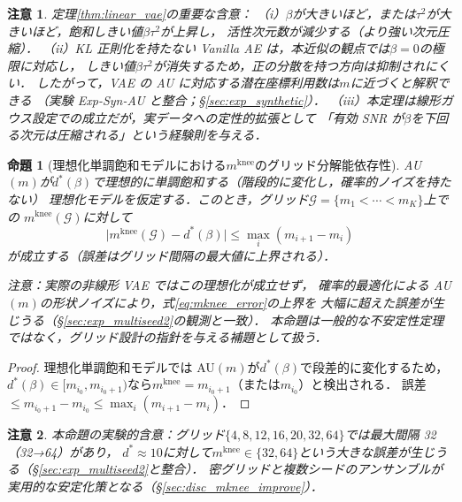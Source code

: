 \documentclass[11pt,a4paper]{jsarticle}
\newtheorem{proposition}{命題}
\newtheorem{remark}{注意}
\newcommand{\mknee}{m^{\mathrm{knee}}}
\begin{document}
\begin{remark}
定理\ref{thm:linear_vae}の重要な含意：
（i）$\beta$が大きいほど，または$\tau^2$が大きいほど，飽和しきい値$\beta\tau^2$が上昇し，
活性次元数が減少する（より強い次元圧縮）．
（ii）KL 正則化を持たない Vanilla AE は，本近似の観点では$\beta = 0$の極限に対応し，
しきい値$\beta\tau^2$が消失するため，正の分散を持つ方向は抑制されにくい．
したがって，VAE の AU に対応する潜在座標利用数は$m$に近づくと解釈できる
（実験 Exp-Syn-AU と整合；§\ref{sec:exp_synthetic}）．
（iii）本定理は線形ガウス設定での成立だが，実データへの定性的拡張として
「有効 SNR が$\beta$を下回る次元は圧縮される」という経験則を与える．
\end{remark}

\begin{proposition}[理想化単調飽和モデルにおける$\mknee$のグリッド分解能依存性]\label{thm:mknee_instab}
AU$(m)$が$d^*(\beta)$で理想的に単調飽和する（階段的に変化し，確率的ノイズを持たない）
理想化モデルを仮定する．このとき，グリッド$\mathcal{G} = \{m_1 < \cdots < m_K\}$上での
$\mknee(\mathcal{G})$に対して
\begin{equation}
  \bigl|\mknee(\mathcal{G}) - d^*(\beta)\bigr|
  \leq \max_{i} (m_{i+1} - m_i)
  \label{eq:mknee_error}
\end{equation}
が成立する（誤差はグリッド間隔の最大値に上界される）．

\noindent\textit{注意：実際の非線形 VAE ではこの理想化が成立せず，
確率的最適化による AU$(m)$の形状ノイズにより，式\eqref{eq:mknee_error}の上界を
大幅に超えた誤差が生じうる（§\ref{sec:exp_multiseed2}の観測と一致）．
本命題は一般的な不安定性定理ではなく，グリッド設計の指針を与える補題として扱う．}
\end{proposition}

\begin{proof}
理想化単調飽和モデルでは AU$(m)$が$d^*(\beta)$で段差的に変化するため，
$d^*(\beta) \in [m_{i_0}, m_{i_0+1})$なら$\mknee = m_{i_0+1}$（または$m_{i_0}$）と検出される．
誤差$\leq m_{i_0+1} - m_{i_0} \leq \max_i(m_{i+1}-m_i)$．
\end{proof}

\begin{remark}
本命題の実験的含意：グリッド$\{4,8,12,16,20,32,64\}$では最大間隔 32（32→64）があり，
$d^* \approx 10$に対して$\mknee \in \{32, 64\}$という大きな誤差が生じうる（§\ref{sec:exp_multiseed2}と整合）．
密グリッドと複数シードのアンサンブルが実用的な安定化策となる（§\ref{sec:disc_mknee_improve}）．
\end{remark}
\end{document}
